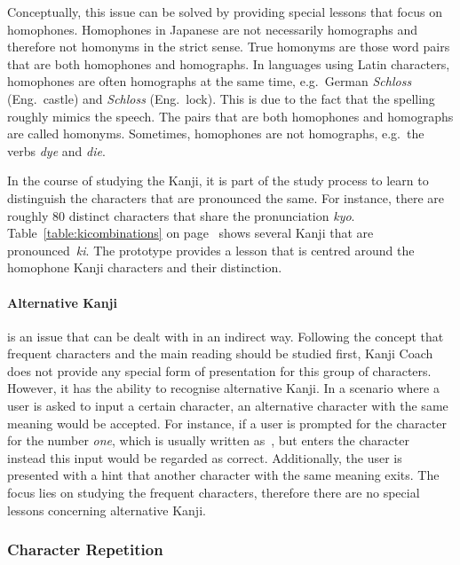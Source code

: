 Conceptually, this issue can be solved by providing special lessons that focus on
homophones. Homophones in Japanese are not necessarily homographs and therefore 
not homonyms in the strict sense. True homonyms are those word pairs that are 
both homophones and homographs. In languages using Latin characters,
homophones are often homographs at the same time, e.g.\ German \emph{Schloss} 
(Eng.\ castle) and \emph{Schloss} (Eng.\ lock). This is due to the fact that
the spelling roughly mimics the speech. The pairs that are both homophones and
homographs are called homonyms. Sometimes, homophones are not homographs, 
e.g.\ the verbs \emph{dye} and \emph{die}.

In the course of studying the Kanji, it is part of the study process to 
learn to distinguish the characters that are pronounced the same.
For instance, there are roughly 80 distinct characters that share the
pronunciation \emph{kyo}. Table~\ref{table:kicombinations} on 
page~\pageref{table:kicombinations} shows several Kanji that are 
pronounced~\emph{ki}. The prototype provides a lesson that is centred around 
the homophone Kanji characters and their distinction.

\paragraph{Alternative Kanji} is an issue that can be dealt with in an indirect
way. Following the concept that frequent characters and the main reading should 
be studied first, Kanji Coach does not provide any special form of presentation
for this group of characters. However, it has the ability to recognise 
alternative Kanji. In a scenario where a user is asked to input a certain 
character, an alternative character with the same meaning would be accepted. 
For instance, if a user is prompted for the character for the number \emph{one}, 
which is usually written as~, but enters the character~ instead
this input would be regarded as correct. Additionally, the user is presented 
with a hint that another character with the same meaning exits. 
The focus lies on studying the frequent characters, therefore there are no 
special lessons concerning alternative Kanji.

\subsubsection{Character Repetition}
\label{sec:concept:characterrepetition} %

